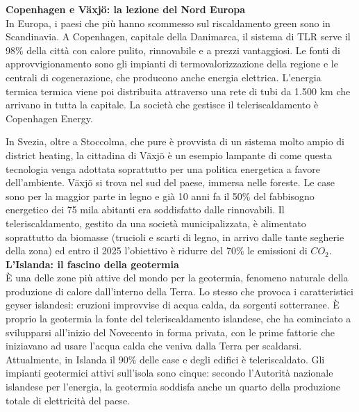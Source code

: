 \documentclass[laurea,oneside,11pt]{USiena_tesiLM}
\begin{document}
\noindent\textbf{Copenhagen e Växjö: la lezione del Nord Europa}\\
\noindent In Europa, i paesi che più hanno scommesso sul riscaldamento green sono in Scandinavia. A Copenhagen, capitale della Danimarca, il sistema di TLR serve il 98\% della città con calore pulito, rinnovabile e a prezzi vantaggiosi. Le fonti di approvvigionamento sono gli impianti di termovalorizzazione della regione e le centrali di cogenerazione, che producono anche energia elettrica. L'energia termica termica viene poi distribuita attraverso una rete di tubi da 1.500 km che arrivano in tutta la capitale. La società che gestisce il teleriscaldamento è Copenhagen Energy.

In Svezia, oltre a Stoccolma, che pure è provvista di un sistema molto ampio di district heating, la cittadina di Växjö è un esempio lampante di come questa tecnologia venga adottata soprattutto per una politica energetica a favore dell'ambiente. Växjö si trova nel sud del paese, immersa nelle foreste. Le case sono per la maggior parte in legno e già 10 anni fa il 50\% del fabbisogno energetico dei 75 mila abitanti era soddisfatto dalle rinnovabili. Il teleriscaldamento, gestito da una società municipalizzata, è alimentato soprattutto da biomasse (trucioli e scarti di legno, in arrivo dalle tante segherie della zona) ed entro il 2025 l'obiettivo è ridurre del 70\% le emissioni di $CO_2$.\\

\noindent\textbf{L’Islanda: il fascino della geotermia}\\
\noindent \`E una delle zone più attive del mondo per la geotermia, fenomeno naturale della produzione di calore dall'interno della Terra. Lo stesso che provoca i caratteristici geyser islandesi: eruzioni improvvise di acqua calda, da sorgenti sotterranee. \`E proprio la geotermia la fonte del teleriscaldamento islandese, che ha cominciato a svilupparsi all'inizio del Novecento in forma privata, con le prime fattorie che iniziavano ad usare l'acqua calda che veniva dalla Terra per scaldarsi. Attualmente, in Islanda il 90\% delle case e degli edifici è teleriscaldato. Gli impianti geotermici attivi sull'isola sono cinque: secondo l'Autorità nazionale islandese per l'energia, la geotermia soddisfa anche un quarto della produzione totale di elettricità del paese.\\
\end{document}
